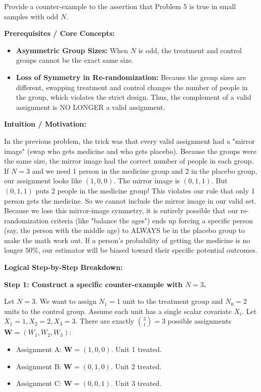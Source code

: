 \begin{exercise}\label{probability:2020:6}
Provide a counter-example to the assertion that Problem 5 is true in small samples with odd $N$.
\end{exercise}

\begin{solution}
\textbf{Prerequisites / Core Concepts:}
\begin{itemize}
    \item \textbf{Asymmetric Group Sizes:} When $N$ is odd, the treatment and control groups cannot be the exact same size.
    \item \textbf{Loss of Symmetry in Re-randomization:} Because the group sizes are different, swapping treatment and control changes the number of people in the group, which violates the strict design. Thus, the complement of a valid assignment is NO LONGER a valid assignment.
\end{itemize}

\textbf{Intuition / Motivation:}

In the previous problem, the trick was that every valid assignment had a "mirror image" (swap who gets medicine and who gets placebo). Because the groups were the same size, the mirror image had the correct number of people in each group.
If $N=3$ and we need 1 person in the medicine group and 2 in the placebo group, our assignment looks like $(1, 0, 0)$. The mirror image is $(0, 1, 1)$. But $(0, 1, 1)$ puts 2 people in the medicine group! This violates our rule that only 1 person gets the medicine. So we cannot include the mirror image in our valid set.
Because we lose this mirror-image symmetry, it is entirely possible that our re-randomization criteria (like "balance the ages") ends up forcing a specific person (say, the person with the middle age) to ALWAYS be in the placebo group to make the math work out. If a person's probability of getting the medicine is no longer $50\%$, our estimator will be biased toward their specific potential outcomes.

\textbf{Logical Step-by-Step Breakdown:}

\textbf{Step 1: Construct a specific counter-example with $N=3$.}

Let $N = 3$. We want to assign $N_1 = 1$ unit to the treatment group and $N_0 = 2$ units to the control group.
Assume each unit has a single scalar covariate $X_i$. Let $X_1 = 1, X_2 = 2, X_3 = 3$.
There are exactly $\binom{3}{1} = 3$ possible assignments $\mathbf{W} = (W_1, W_2, W_3)$:
\begin{itemize}
    \item Assignment A: $\mathbf{W} = (1, 0, 0)$. Unit 1 treated.
    \item Assignment B: $\mathbf{W} = (0, 1, 0)$. Unit 2 treated.
    \item Assignment C: $\mathbf{W} = (0, 0, 1)$. Unit 3 treated.
\end{itemize}


\end{solution}
